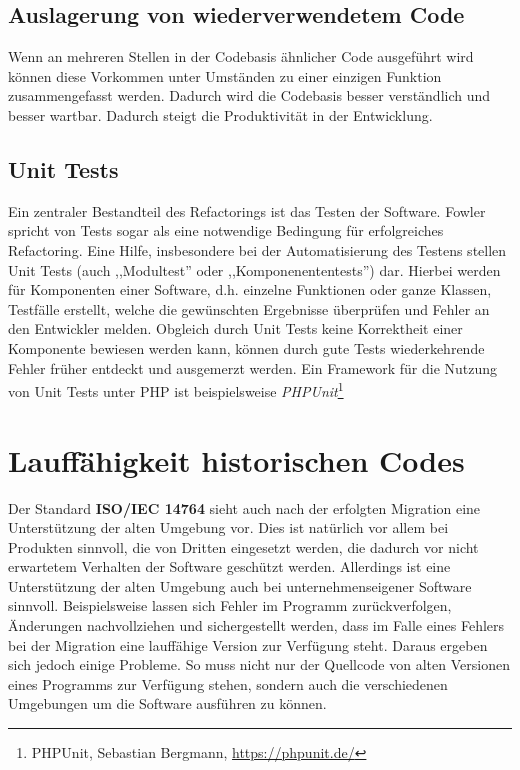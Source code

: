     \subsection{Auslagerung von wiederverwendetem Code}
    Wenn an mehreren Stellen in der Codebasis ähnlicher Code ausgeführt wird können diese Vorkommen unter Umständen zu einer 
    einzigen Funktion zusammengefasst werden.\cite[S. 63]{fowler_refactoring_1999} Dadurch wird die Codebasis besser verständlich 
    und besser wartbar. Dadurch steigt die Produktivität in der Entwicklung.\cite{martin_clean_2012}    
    \subsection{Unit Tests}
    Ein zentraler Bestandteil des Refactorings ist das Testen der Software. 
    Fowler spricht von Tests sogar als eine notwendige Bedingung für erfolgreiches Refactoring.\cite[S. 73]{fowler_refactoring_1999} 
    Eine Hilfe, insbesondere bei der Automatisierung des Testens stellen Unit Tests (auch ,,Modultest'' oder ,,Komponenententests'')
    dar. Hierbei werden für Komponenten einer Software, d.h. einzelne Funktionen oder ganze Klassen, Testfälle erstellt, welche 
    die gewünschten Ergebnisse überprüfen und Fehler an den Entwickler melden. Obgleich durch Unit Tests keine Korrektheit einer 
    Komponente bewiesen werden kann, können durch gute Tests wiederkehrende Fehler früher entdeckt und ausgemerzt werden. 
    Ein Framework für die Nutzung von Unit Tests unter \ac{PHP} ist beispielsweise \textit{PHPUnit}\footnote{PHPUnit, Sebastian Bergmann, \url{https://phpunit.de/}} 

\section{Lauffähigkeit historischen Codes}\label{VCS}
    Der Standard \textbf{ISO/IEC 14764} sieht auch nach der erfolgten Migration eine Unterstützung der alten Umgebung vor. Dies ist natürlich vor allem bei Produkten sinnvoll, 
    die von Dritten eingesetzt werden, die dadurch vor nicht erwartetem Verhalten der Software geschützt werden. Allerdings ist eine Unterstützung der alten Umgebung 
    auch bei unternehmenseigener Software sinnvoll. Beispielsweise lassen sich Fehler im Programm zurückverfolgen, Änderungen nachvollziehen und sichergestellt werden,
    dass im Falle eines Fehlers bei der Migration eine lauffähige Version zur Verfügung steht. Daraus ergeben sich jedoch einige Probleme. So muss nicht nur der Quellcode 
    von alten Versionen eines Programms zur Verfügung stehen, sondern auch die verschiedenen Umgebungen um die Software ausführen zu können.
